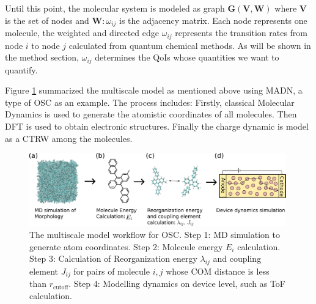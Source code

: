 \documentclass[letterpaper,12pt]{article}
\begin{document}
Until this point, the molecular system is modeled as graph $\mathbf{G}(\mathbf{V}, \mathbf{W})$ where $\mathbf{V}$ is the set of nodes and $\mathbf{W}: \omega_{ij}$ is the adjacency matrix. Each node represents one molecule, the weighted and directed edge $\omega_{ij}$ represents the transition rates from node $i$ to node $j$ calculated from quantum chemical methods. 
As will be shown in the method section, $\omega_{ij}$ determines the QoIs whose quantities we want to quantify.

Figure \ref{fig:MSM} summarized the multiscale model as mentioned above using MADN, a type of OSC as an example. 
The process includes: Firstly, classical Molecular Dynamics is used to generate the atomistic coordinates of all molecules. Then DFT is used to obtain electronic structures. Finally the charge dynamic is model as a CTRW among the molecules.

\begin{figure}[h]
    \centering
    \includegraphics[width=0.99\textwidth]{figs/MSM.pdf}
    \caption{The multiscale model workflow for OSC. Step 1: MD simulation to generate atom coordinates. Step 2: Molecule energy $E_i$ calculation. Step 3: Calculation of Reorganization energy $\lambda_{ij}$ and coupling element $J_{ij}$ for pairs of molecule $i,j$ whose COM distance is less than $r_\text{cutoff}$. Step 4: Modelling dynamics on device level, such as ToF calculation.}
    \label{fig:MSM}
\end{figure}
\end{document}

